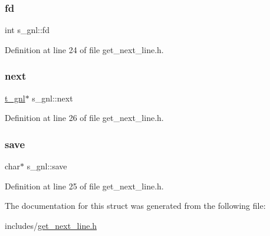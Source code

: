 \subsubsection{\texorpdfstring{fd}{fd}}
{\footnotesize\ttfamily int s\+\_\+gnl\+::fd}



Definition at line 24 of file get\+\_\+next\+\_\+line.\+h.

\mbox{\label{structs__gnl_ae99486a88491aaa37454a7f76ed99657}} 
\subsubsection{\texorpdfstring{next}{next}}
{\footnotesize\ttfamily \hyperlink{get__next__line_8h_ad253c7263891a8ba7b1fdf193cc58c59}{t\+\_\+gnl}$\ast$ s\+\_\+gnl\+::next}



Definition at line 26 of file get\+\_\+next\+\_\+line.\+h.

\mbox{\label{structs__gnl_a44222278a024bbe4b391b746010444a4}} 
\subsubsection{\texorpdfstring{save}{save}}
{\footnotesize\ttfamily char$\ast$ s\+\_\+gnl\+::save}



Definition at line 25 of file get\+\_\+next\+\_\+line.\+h.



The documentation for this struct was generated from the following file\+:\begin{DoxyCompactItemize}
\item 
includes/\hyperlink{get__next__line_8h}{get\+\_\+next\+\_\+line.\+h}\end{DoxyCompactItemize}
